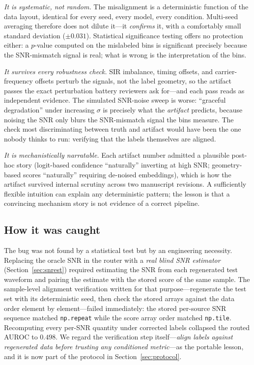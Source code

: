 \documentclass[review,12pt]{elsarticle}
\begin{document}
\emph{It is systematic, not random.} The misalignment is a deterministic
function of the data layout, identical for every seed, every model,
every condition. Multi-seed averaging therefore does not dilute it---it
\emph{confirms} it, with a comfortably small standard deviation
($\pm 0.031$). Statistical significance testing offers no protection
either: a $p$-value computed on the mislabeled bins is significant
precisely because the SNR-mismatch signal is real; what is wrong is
the interpretation of the bins.

\emph{It survives every robustness check.} SIR imbalance, timing
offsets, and carrier-frequency offsets perturb the signals, not the
label geometry, so the artifact passes the exact perturbation battery
reviewers ask for---and each pass reads as independent evidence. The
simulated SNR-noise sweep is worse: ``graceful degradation'' under
increasing $\sigma$ is precisely what the \emph{artifact} predicts,
because noising the SNR only blurs the SNR-mismatch signal the bins
measure. The check most discriminating between truth and artifact
would have been the one nobody thinks to run: verifying that the
labels themselves are aligned.

\emph{It is mechanistically narratable.} Each artifact number admitted
a plausible post-hoc story (logit-based confidence ``naturally''
inverting at high SNR; geometry-based scores ``naturally'' requiring
de-noised embeddings), which is how the artifact survived internal
scrutiny across two manuscript revisions. A sufficiently flexible
intuition can explain any deterministic pattern; the lesson is that a
convincing mechanism story is not evidence of a correct pipeline.

\subsection{How it was caught}

The bug was not found by a statistical test but by an engineering
necessity. Replacing the oracle SNR in the router with a \emph{real
blind SNR estimator} (Section~\ref{sec:snrest}) required estimating the
SNR from each regenerated test waveform and pairing the estimate with
the stored score of the same sample. The sample-level alignment
verification written for that purpose---regenerate the test set with
its deterministic seed, then check the stored arrays against the data
order element by element---failed immediately: the stored per-source
SNR sequence matched \texttt{np.repeat} while the score array order
matched \texttt{np.tile}. Recomputing every per-SNR quantity under
corrected labels collapsed the routed AUROC to $0.498$. We regard the
verification step itself---\emph{align labels against regenerated data
before trusting any conditioned metric}---as the portable lesson, and
it is now part of the protocol in Section~\ref{sec:protocol}.
\end{document}
